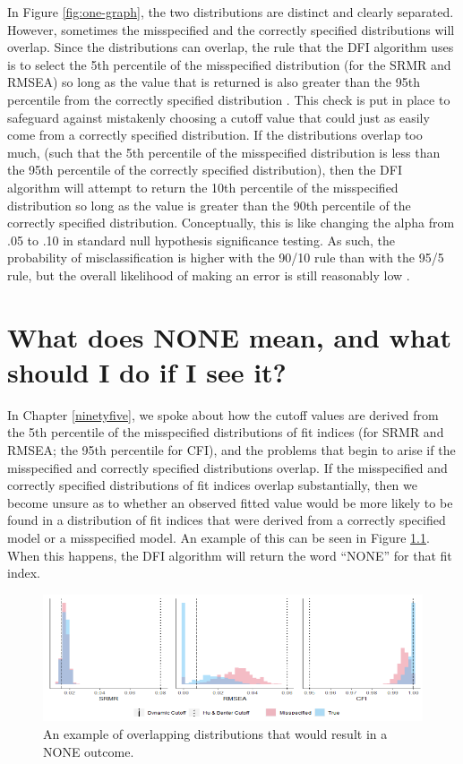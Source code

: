 \documentclass[
]{book}
\begin{document}
In Figure \ref{fig:one-graph}, the two distributions are distinct and clearly separated. However, sometimes the misspecified and the correctly specified distributions will overlap. Since the distributions can overlap, the rule that the DFI algorithm uses is to select the 5th percentile of the misspecified distribution (for the SRMR and RMSEA) so long as the value that is returned is also greater than the 95th percentile from the correctly specified distribution . This check is put in place to safeguard against mistakenly choosing a cutoff value that could just as easily come from a correctly specified distribution. If the distributions overlap too much, (such that the 5th percentile of the misspecified distribution is less than the 95th percentile of the correctly specified distribution), then the DFI algorithm will attempt to return the 10th percentile of the misspecified distribution so long as the value is greater than the 90th percentile of the correctly specified distribution. Conceptually, this is like changing the alpha from .05 to .10 in standard null hypothesis significance testing. As such, the probability of misclassification is higher with the 90/10 rule than with the 95/5 rule, but the overall likelihood of making an error is still reasonably low \citep{mcneish_dynamic_2022}.

\hypertarget{none}{%
\chapter{What does NONE mean, and what should I do if I see it?}\label{none}}

In Chapter \ref{ninetyfive}, we spoke about how the cutoff values are derived from the 5th percentile of the misspecified distributions of fit indices (for SRMR and RMSEA; the 95th percentile for CFI), and the problems that begin to arise if the misspecified and correctly specified distributions overlap. If the misspecified and correctly specified distributions of fit indices overlap substantially, then we become unsure as to whether an observed fitted value would be more likely to be found in a distribution of fit indices that were derived from a correctly specified model or a misspecified model. An example of this can be seen in Figure \ref{fig:overlap}. When this happens, the DFI algorithm will return the word ``NONE'' for that fit index.

\begin{figure}

{\centering \includegraphics[width=1\linewidth]{overlap} 

}

\caption{An example of overlapping distributions that would result in a NONE outcome.}\label{fig:overlap}
\end{figure}
\end{document}
